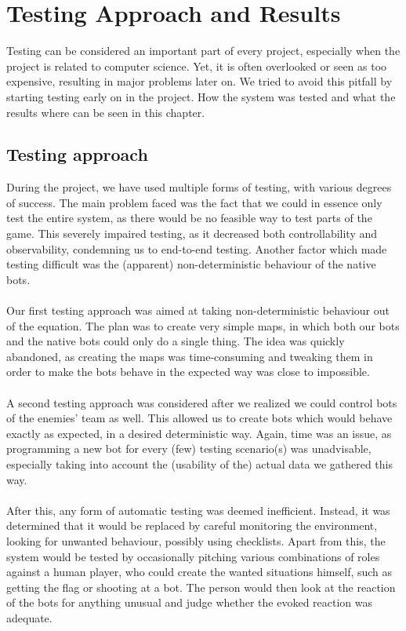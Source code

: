 \chapter{Testing Approach and Results}

Testing can be considered an important part of every project, especially when the project is related to computer science. Yet, it is often overlooked or seen as too expensive, resulting in major problems later on. We tried to avoid this pitfall by starting testing early on in the project. How the system was tested and what the results where can be seen in this chapter.

\section{Testing approach}
During the project, we have used multiple forms of testing, with various degrees of success. The main problem faced was the fact that we could in essence only test the entire system, as there would be no feasible way to test parts of the game. This severely impaired testing, as it decreased both controllability and observability, condemning us to end-to-end testing. Another factor which made testing difficult was the (apparent) non-deterministic behaviour of the native bots.\\
\\
Our first testing approach was aimed at taking non-deterministic behaviour out of the equation. The plan was to create very simple maps, in which both our bots and the native bots could only do a single thing. The idea was quickly abandoned, as creating the maps was time-consuming and tweaking them in order to make the bots behave in the expected way was close to impossible.\\
\\
A second testing approach was considered after we realized we could control bots of the enemies' team as well. This allowed us to create bots which would behave exactly as expected, in a desired deterministic way. Again, time was an issue, as programming a new bot for every (few) testing scenario(s) was unadvisable, especially taking into account the (usability of the) actual data we gathered this way.\\
\\
After this, any form of automatic testing was deemed inefficient. Instead, it was determined that it would be replaced by careful monitoring the environment, looking for unwanted behaviour, possibly using checklists. Apart from this, the system would be tested by occasionally pitching various combinations of roles against a human player, who could create the wanted situations himself, such as getting the flag or shooting at a bot. The person would then look at the reaction of the bots for anything unusual and judge whether the evoked reaction was adequate.\\

